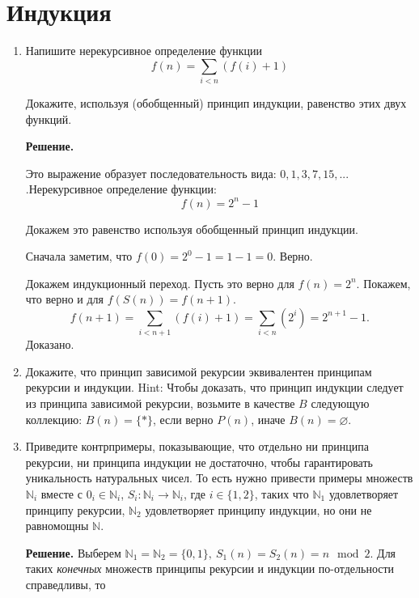 \section*{Индукция}
\begin{enumerate}

\item Напишите нерекурсивное определение функции
\[ f(n) = \sum_{i < n} (f(i) + 1) \]

Докажите, используя (обобщенный) принцип индукции, равенство этих двух функций.

\textbf{Решение.} 

Это выражение образует последовательность вида: $0, 1, 3, 7, 15,...$ .Нерекурсивное 
определение функции: 
\begin{equation*}
f(n) = 2^n - 1
\end{equation*}

Докажем это равенство используя обобщенный принцип индукции.

Сначала заметим, что $f(0) = 2^0 - 1 = 1 - 1 = 0$. Верно.

Докажем индукционный переход. Пусть это верно для $f(n) = 2^n$. Покажем, что верно и для 
$f(S(n)) = f(n + 1)$.
\begin{equation*}
f(n + 1) = \sum_{i < n + 1} (f(i) + 1) = \sum_{i<n}(2^i) = 2^{n + 1} - 1.
\end{equation*}
Доказано.

\item Докажите, что принцип зависимой рекурсии эквивалентен принципам рекурсии и индукции.
    Hint: Чтобы доказать, что принцип индукции следует из принципа зависимой рекурсии, возьмите 
    в качестве $B$ следующую коллекцию:
    $B(n) = \{ * \}$, если верно $P(n)$, иначе $B(n) = \varnothing$.

\item Приведите контрпримеры, показывающие, что отдельно ни принципа рекурсии, ни принципа 
индукции не достаточно, чтобы гарантировать уникальность натуральных чисел.
    То есть нужно привести примеры множеств $\mathbb{N}_i$ вместе с $0_i \in \mathbb{N}_i$, $S_i 
    : \mathbb{N}_i \to \mathbb{N}_i$, где $i \in \{ 1, 2 \}$,
    таких что $\mathbb{N}_1$ удовлетворяет принципу рекурсии, $\mathbb{N}_2$ удовлетворяет 
    принципу индукции, но они не равномощны $\mathbb{N}$.
    
\textbf{Решение.} Выберем $\mathbb{N}_1 = \mathbb{N}_2 = \{0, 1\}, \ S_1(n) = S_2(n) = n\mod 2$. Для таких \textit{конечных} множеств принципы рекурсии и индукции по-отдельности справедливы, то 


\end{enumerate}
